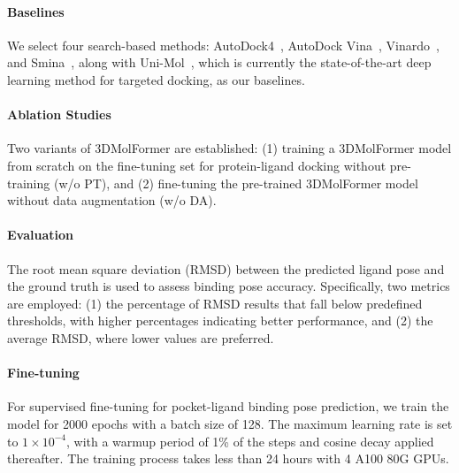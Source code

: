 \paragraph{Baselines} We select four search-based methods: AutoDock4~\citep{AutoDock4}, AutoDock Vina~\citep{AutoDockVina,AutoDockVina2}, Vinardo~\citep{Vinardo}, and Smina~\citep{Smina}, along with Uni-Mol~\citep{Uni-Mol}, which is currently the state-of-the-art deep learning method for targeted docking, as our baselines.

\paragraph{Ablation Studies} Two variants of 3DMolFormer are established: (1) training a 3DMolFormer model from scratch on the fine-tuning set for protein-ligand docking without pre-training (w/o PT), and (2) fine-tuning the pre-trained 3DMolFormer model without data augmentation (w/o DA).

\paragraph{Evaluation} The root mean square deviation (RMSD) between the predicted ligand pose and the ground truth is used to assess binding pose accuracy. Specifically, two metrics are employed: (1) the percentage of RMSD results that fall below predefined thresholds, with higher percentages indicating better performance, and (2) the average RMSD, where lower values are preferred.

\paragraph{Fine-tuning} For supervised fine-tuning for pocket-ligand binding pose prediction, we train the model for 2000 epochs with a batch size of 128. The maximum learning rate is set to $1\times10^{-4}$, with a warmup period of 1\% of the steps and cosine decay applied thereafter. The training process takes less than 24 hours with 4 A100 80G GPUs.

